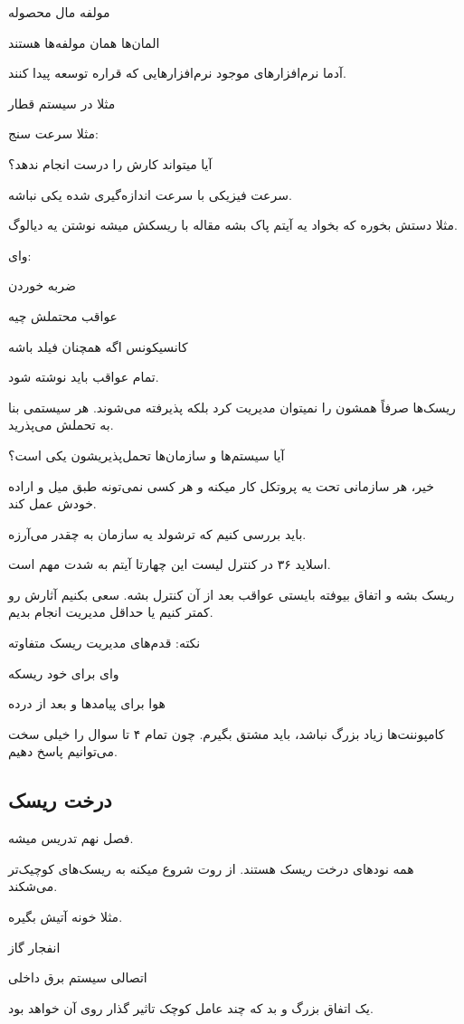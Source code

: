 مولفه مال محصوله

المان‌ها همان مولفه‌ها هستند

آدما
نرم‌افزارهای موجود
نرم‌افزارهایی که قراره توسعه پیدا کنند.

مثلا در سیستم قطار

مثلا سرعت سنج:

آیا میتواند کارش را درست انجام ندهد؟

سرعت فیزیکی با سرعت اندازه‌گیری شده یکی نباشه.

مثلا دستش بخوره که بخواد یه آیتم پاک بشه مقاله با ریسکش میشه نوشتن یه دیالوگ.

وای:

ضربه خوردن

عواقب محتملش چیه

کانسیکونس اگه همچنان فیلد باشه

تمام عواقب باید نوشته شود.

ریسک‌ها صرفاً همشون را نمیتوان مدیریت کرد بلکه پذیرفته می‌شوند. هر سیستمی بنا به
تحملش می‌پذرید.

آیا سیستم‌ها و سازمان‌ها تحمل‌پذیریشون یکی است؟

خیر، هر سازمانی تحت یه پروتکل کار میکنه و هر کسی نمی‌تونه طبق میل و اراده خودش
عمل کند.

باید بررسی کنیم که ترشولد یه سازمان به چقدر می‌آرزه.

اسلاید ۳۶ در کنترل لیست این چهارتا آیتم به شدت مهم است.

ریسک بشه و اتفاق بیوفته بایستی عواقب بعد از آن کنترل بشه. سعی بکنیم آثارش رو
کمتر کنیم یا حداقل مدیریت انجام بدیم.

نکته: قدم‌های مدیریت ریسک متفاوته

وای برای خود ریسکه

هوا برای پیامد‌ها و بعد از درده

کامپوننت‌ها زیاد بزرگ نباشد، باید مشتق بگیرم. چون تمام ۴ تا سوال را خیلی سخت
می‌توانیم پاسخ دهیم.

\subsection{درخت ریسک}

فصل نهم تدریس میشه.

همه نود‌های درخت ریسک هستند. از روت شروع میکنه به ریسک‌های کوچیک‌تر می‌شکند.

مثلا خونه آتیش بگیره.

انفجار گاز

اتصالی سیستم برق داخلی

یک اتفاق بزرگ و بد که چند عامل کوچک تاثیر گذار روی آن خواهد بود.


